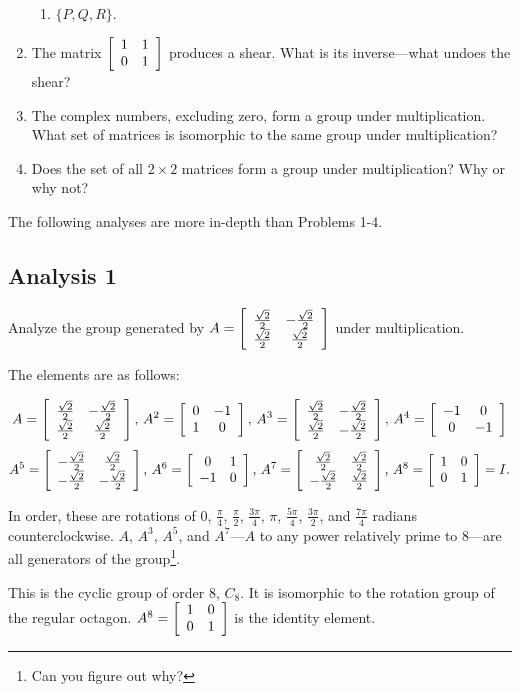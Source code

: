 \documentclass[../gatm.tex]{subfiles}
\begin{document}
\begin{enumerate}
\begin{multicols}{4}
\begin{enumerate}
\item $\{P,Q,R\}.$
\end{enumerate}
\end{multicols}
\item The matrix $\left[\begin{array}{cc} 1 & 1 \\ 0 & 1 \end{array}\right]$ produces a shear. What is its inverse---what undoes the shear?
\item The complex numbers, excluding zero, form a group under multiplication. What set of matrices is isomorphic to the same group under multiplication?
\item Does the set of all $2\times 2$ matrices form a group under multiplication? Why or why not?
\end{enumerate}

The following analyses are more in-depth than Problems 1-4.

\subsection*{Analysis 1}

Analyze the group generated by $A=\left[\begin{array}{cc} \frac{\sqrt{2}}{2} & -\frac{\sqrt{2}}{2} \\ \frac{\sqrt{2}}{2} & \frac{\sqrt{2}}{2} \end{array}\right]$ under multiplication.

The elements are as follows:

$$A= \left[\begin{array}{cc} \frac{\sqrt{2}}{2} & -\frac{\sqrt{2}}{2} \\ \frac{\sqrt{2}}{2} & \frac{\sqrt{2}}{2} \end{array}\right],\,
A^2 = \left[\begin{array}{cc} 0 & -1 \\ 1 & 0 \end{array}\right],\,
A^3 = \left[\begin{array}{cc} \frac{\sqrt{2}}{2} & -\frac{\sqrt{2}}{2} \\ \frac{\sqrt{2}}{2} & -\frac{\sqrt{2}}{2} \end{array}\right],\,
A^4 = \left[\begin{array}{cc} -1 & 0 \\ 0 & -1 \end{array}\right]$$
$$A^5 = \left[\begin{array}{cc} -\frac{\sqrt{2}}{2} & \frac{\sqrt{2}}{2} \\ -\frac{\sqrt{2}}{2} & -\frac{\sqrt{2}}{2} \end{array}\right],\,
A^6 = \left[\begin{array}{cc} 0 & 1 \\ -1 & 0 \end{array}\right],\,
A^7 = \left[\begin{array}{cc} \frac{\sqrt{2}}{2} & \frac{\sqrt{2}}{2} \\ -\frac{\sqrt{2}}{2} & \frac{\sqrt{2}}{2} \end{array}\right],\,
A^8 = \left[\begin{array}{cc} 1 & 0 \\ 0 & 1 \end{array}\right] = I.$$

In order, these are rotations of $0$, $\frac{\pi}{4}$, $\frac{\pi}{2}$, $\frac{3\pi}{4}$, $\pi$, $\frac{5\pi}{4}$, $\frac{3\pi}{2}$, and $\frac{7\pi}{4}$ radians counterclockwise. $A$, $A^3$, $A^5$, and $A^7$---$A$ to any power relatively prime to $8$---are all generators of the group\footnote{Can you figure out why?}.

This is the cyclic group of order $8$, $C_8$. It is isomorphic to the rotation group of the regular octagon. $A^8=\left[\begin{array}{cc} 1 & 0 \\ 0 & 1 \end{array}\right]$ is the identity element.
\end{document}
